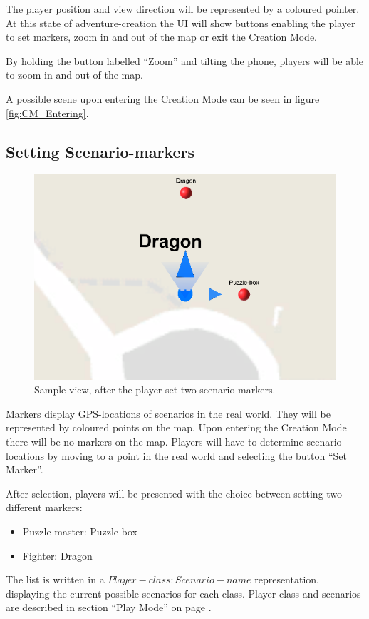 \documentclass{sigchi-ext}
\begin{document}
The player position and view direction will be represented by a coloured pointer. At this state of adventure-creation the UI will show buttons enabling the player to set markers, zoom in and out of the map or exit the Creation Mode.

By holding the button labelled ``Zoom'' and tilting the phone, players will be able to zoom in and out of the map.

A possible scene upon entering the Creation Mode can be seen in figure \ref{fig:CM_Entering}.


 

\subsection{Setting Scenario-markers}

\begin{figure}
	\includegraphics[width=1\columnwidth]{figures/CM_Markers}
	\caption{Sample view, after the player set two scenario-markers.}\label{fig:CM_Markers}
\end{figure}

Markers display GPS-locations of scenarios in the real world. They will be represented by coloured points on the map. Upon entering the Creation Mode there will be no markers on the map. Players will have to determine scenario-locations by moving to a point in the real world and selecting the button ``Set Marker''.

After selection, players will be presented with the choice between setting two different markers:
\begin{itemize}\compresslist%
	\item Puzzle-master: Puzzle-box
	\item Fighter: Dragon
\end{itemize}
The list is written in a $Player-class: Scenario-name$ representation, displaying the current possible scenarios for each class. Player-class and scenarios are described in section ``Play Mode'' on page \pageref{sec:Play}.
\end{document}
